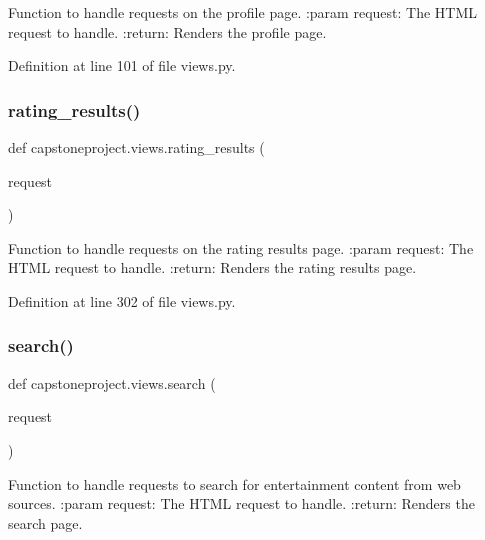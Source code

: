 \begin{DoxyVerb}Function to handle requests on the profile page.
:param request: The HTML request to handle.
:return: Renders the profile page.
\end{DoxyVerb}
 

Definition at line 101 of file views.\+py.

\mbox{\label{namespacecapstoneproject_1_1views_a2e8e189da407be2e8849d6712edf0776}} 
\subsubsection{\texorpdfstring{rating\+\_\+results()}{rating\_results()}}
{\footnotesize\ttfamily def capstoneproject.\+views.\+rating\+\_\+results (\begin{DoxyParamCaption}\item[{}]{request }\end{DoxyParamCaption})}

\begin{DoxyVerb}Function to handle requests on the rating results page.
:param request: The HTML request to handle.
:return: Renders the rating results page.
\end{DoxyVerb}
 

Definition at line 302 of file views.\+py.

\mbox{\label{namespacecapstoneproject_1_1views_af8c2155e11146bf5b527cdee0859f44a}} 
\subsubsection{\texorpdfstring{search()}{search()}}
{\footnotesize\ttfamily def capstoneproject.\+views.\+search (\begin{DoxyParamCaption}\item[{}]{request }\end{DoxyParamCaption})}

\begin{DoxyVerb}Function to handle requests to search for entertainment content from web
    sources.
:param request: The HTML request to handle.
:return: Renders the search page.
\end{DoxyVerb}
 

